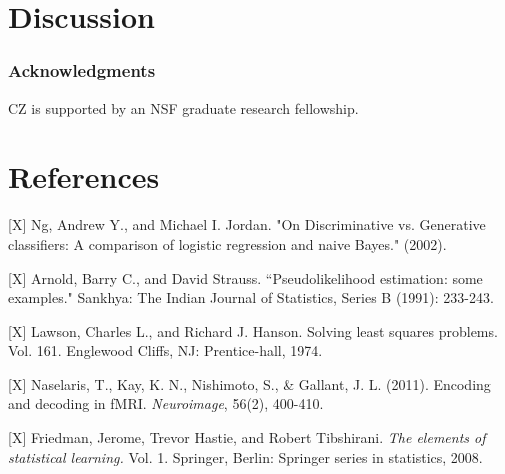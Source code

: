 \documentclass{article}
\begin{document}
\section{Discussion}


\subsubsection*{Acknowledgments}

CZ is supported by an NSF graduate research fellowship.

\section*{References}

\small

[X] Ng, Andrew Y., and Michael I. Jordan. "On Discriminative vs. Generative classifiers: A comparison of logistic regression and naive Bayes." (2002).

[X] Arnold, Barry C., and David Strauss. ``Pseudolikelihood estimation: some examples." Sankhya: The Indian Journal of Statistics, Series B (1991): 233-243.

[X] Lawson, Charles L., and Richard J. Hanson. Solving least squares problems. Vol. 161. Englewood Cliffs, NJ: Prentice-hall, 1974.

[X] Naselaris, T., Kay, K. N., Nishimoto, S., \& Gallant,
J. L. (2011). Encoding and decoding in fMRI. \emph{Neuroimage}, 56(2),
400-410.

[X] Friedman, Jerome, Trevor Hastie, and Robert Tibshirani. \emph{The elements
of statistical learning.} Vol. 1. Springer, Berlin: Springer series in
statistics, 2008.
\end{document}

